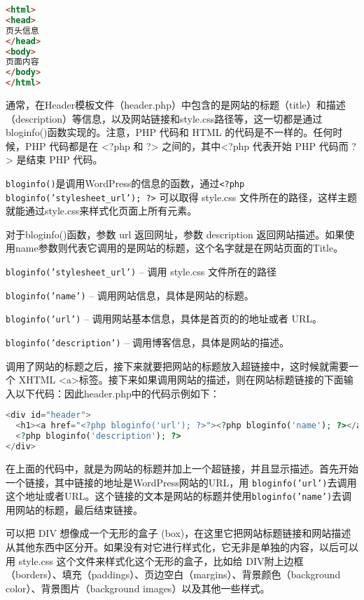 \begin{lstlisting}[language=HTML]
<html>
<head>
页头信息
</head>
<body>
页面内容
</body>
</html>
\end{lstlisting}

通常，在Header模板文件（header.php）中包含的是网站的标题（title）和描述（description）等信息，以及网站链接和style.css路径等，这一切都是通过bloginfo()函数实现的。注意，PHP 代码和 HTML 的代码是不一样的。任何时候，PHP 代码都是在 <?php 和 ?> 之间的，其中<?php 代表开始 PHP 代码而 ?> 是结束 PHP 代码。

\texttt{bloginfo()}是调用WordPress的信息的函数，通过\texttt{<?php bloginfo('stylesheet\_url'); ?>} 可以取得 style.css 文件所在的路径，这样主题就能通过style.css来样式化页面上所有元素。


对于bloginfo()函数，参数 url 返回网址，参数 description 返回网站描述。如果使用name参数则代表它调用的是网站的标题，这个名字就是在网站页面的Title。



\begin{compactitem}
\item \texttt{bloginfo('stylesheet\_url')} – 调用 style.css 文件所在的路径
\item \texttt{bloginfo('name')} – 调用网站信息，具体是网站的标题。
\item \texttt{bloginfo('url')} – 调用网站基本信息，具体是首页的的地址或者 URL。
\item \texttt{bloginfo('description')} – 调用博客信息，具体是网站的描述。
\end{compactitem}

调用了网站的标题之后，接下来就要把网站的标题放入超链接中，这时候就需要一个 XHTML <a>标签。接下来如果调用网站的描述，则在网站标题链接的下面输入以下代码：因此header.php中的代码示例如下：


\begin{lstlisting}[language=PHP]
<div id="header">
  <h1><a href="<?php bloginfo('url'); ?>"><?php bloginfo('name'); ?></a></h1>
  <?php bloginfo('description'); ?>
</div>
\end{lstlisting}

在上面的代码中，就是为网站的标题并加上一个超链接，并且显示描述。首先开始一个链接，其中链接的地址是WordPress网站的URL，用 \texttt{bloginfo('url')}去调用这个地址或者URL。这个链接的文本是网站的标题并使用\texttt{bloginfo('name')}去调用网站的标题，最后结束链接。



可以把 DIV 想像成一个无形的盒子 (box)，在这里它把网站标题链接和网站描述从其他东西中区分开。如果没有对它进行样式化，它无非是单独的内容，以后可以用 style.css 这个文件来样式化这个无形的盒子，比如给 DIV附上边框（borders）、填充（paddings）、页边空白（margins）、背景颜色（background color）、背景图片（background images）以及其他一些样式。


